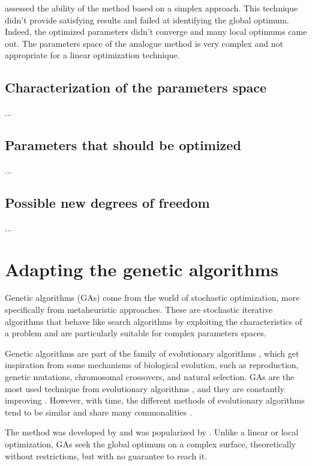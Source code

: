 \documentclass{ametsoc}
\begin{document}
\citet{Horton2012} assessed the ability of the \citep{Nelder1965a} method based on a simplex approach. This technique didn't provide satisfying results and failed at identifying the global optimum. Indeed, the optimized parameters didn't converge and many local optimums came out. The parameters space of the analogue method is very complex and not appropriate for a linear optimization technique. 


\subsection{Characterization of the parameters space}
...

\subsection{Parameters that should be optimized}
...

\subsection{Possible new degrees of freedom}
...


\section{Adapting the genetic algorithms}

Genetic algorithms (GAs) come from the world of stochastic optimization, more specifically from metaheuristic approaches. These are stochastic iterative algorithms that behave like search algorithms by exploiting the characteristics of a problem and are particularly suitable for complex parameters spaces.

Genetic algorithms are part of the family of evolutionary algorithms \citet{Back1993c, Schwefel1993}, which get inspiration from some mechanisms of biological evolution, such as reproduction, genetic mutations, chromosomal crossovers, and natural selection. GAs are the most used technique from evolutionary algorithms \citep{Back1993b}, and they are constantly improving \citep{Haupt2004}. However, with time, the different methods of evolutionary algorithms tend to be similar and share many commonalities \citep{Back1996b, Haupt2004}.

The method was developed by \citet{Holland1992b} and was popularized by \citet{Goldberg1989}. Unlike a linear or local optimization, GAs seek the global optimum on a complex surface, theoretically without restrictions, but with no guarantee to reach it.
\end{document}
